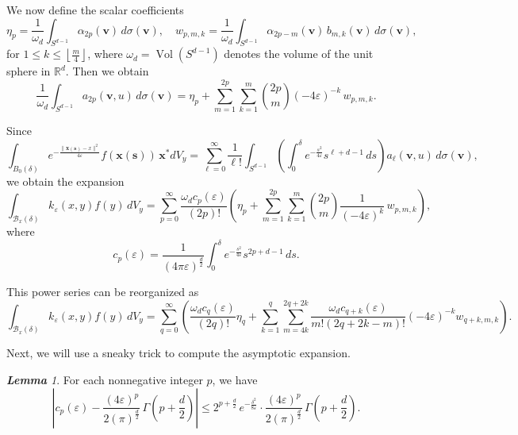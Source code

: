 \documentclass{amsart}
\theoremstyle{Theorem}
\theoremstyle{remark}
\newtheorem{lem}{\bf Lemma}[section]
\numberwithin{equation}{section} \numberwithin{figure}{section}
\begin{document}
We now define the scalar coefficients
\[
\eta_p = \frac{1}{\omega_d} \int_{S^{d-1}} \alpha_{2p}(\mathbf{v}) \, d\sigma(\mathbf{v}), \quad
w_{p,m,k} = \frac{1}{\omega_d} \int_{S^{d-1}} \alpha_{2p - m}(\mathbf{v}) \, b_{m,k}(\mathbf{v}) \, d\sigma(\mathbf{v}),
\]
for \( 1 \leq k \leq \left\lfloor \frac{m}{4} \right\rfloor \), where \( \omega_d = \operatorname{Vol}(S^{d-1}) \) denotes the volume of the unit sphere in \( \mathbb{R}^d \).  
Then we obtain
\[
\frac{1}{\omega_d} \int_{S^{d-1}} a_{2p}(\mathbf{v}, u) \, d\sigma(\mathbf{v})
= \eta_p + \sum_{m=1}^{2p} \sum_{k=1}^{m} \binom{2p}{m} (-4\varepsilon)^{-k} \, w_{p,m,k}.
\]

Since  
\[
\int_{B_0(\delta)} e^{-\frac{\| \mathbf{x}(\mathbf{s}) - x \|^2}{4\varepsilon}} f(\mathbf{x}(\mathbf{s})) \, \mathbf{x}^* dV_y
= \sum_{\ell=0}^{\infty} \frac{1}{\ell!} \int_{S^{d-1}} \left( \int_0^\delta e^{-\frac{s^2}{4\varepsilon}} s^{\ell + d - 1} \, ds \right) a_{\ell}(\mathbf{v}, u) \, d\sigma(\mathbf{v}),
\]
we obtain the expansion  
\[
\int_{\mathcal{B}_x(\delta)} k_\varepsilon(x, y) f(y) \, dV_y
= \sum_{p=0}^{\infty} \frac{ \omega_d c_p(\varepsilon) }{(2p)!}
\left(\eta_p + \sum_{m=1}^{2p} \sum_{k=1}^{m}
\binom{2p}{m} \frac{1}{(-4\varepsilon)^k} \, w_{p,m,k} \right),
\]
where  
\[
c_p(\varepsilon) = \frac{1}{(4\pi\varepsilon)^{\frac{d}{2}}} \int_0^\delta e^{- \frac{s^2}{4\varepsilon}} s^{2p + d - 1} \, ds.
\]

This power series can be reorganized as  
\[
\int_{\mathcal{B}_x(\delta)} k_\varepsilon(x, y) f(y) \, dV_y
= \sum_{q=0}^{\infty} \left( \frac{ \omega_d c_q(\varepsilon) }{(2q)!}\eta_{q}
+ \sum_{k=1}^{q} \sum_{m=4k}^{2q+2k} \frac{\omega_d c_{q+k}(\varepsilon)}{m!(2q+2k-m)!} (-4\varepsilon)^{-k} w_{q+k,m,k} \right).
\]

Next, we will use a sneaky trick to compute the asymptotic expansion.

\begin{lem}
For each nonnegative integer \( p \), we have
\[
\left| c_p(\varepsilon) - \frac{(4\varepsilon)^p}{2(\pi)^{\frac{d}{2}}} \, \Gamma\left( p + \frac{d}{2} \right) \right|
\leq
2^{p + \frac{d}{2}} \, e^{ -\frac{\delta^2}{8\varepsilon} } \cdot \frac{(4\varepsilon)^p}{2(\pi)^{\frac{d}{2}}} \, \Gamma\left( p + \frac{d}{2} \right).
\]
\end{lem}
\end{document}
